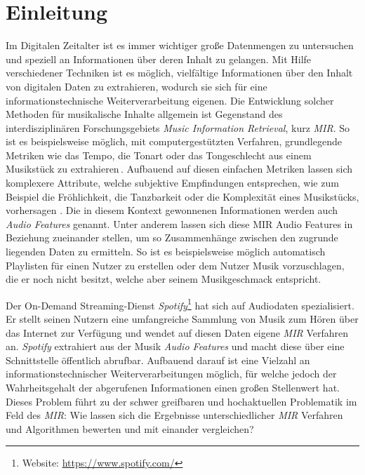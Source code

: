\section*{Einleitung}
\label{sec:Einleitung}

Im Digitalen Zeitalter ist es immer wichtiger große Datenmengen zu untersuchen und speziell an Informationen über deren Inhalt zu gelangen.
Mit Hilfe verschiedener Techniken ist es möglich, vielfältige Informationen über den Inhalt von digitalen Daten zu extrahieren, wodurch sie sich für eine informationstechnische Weiterverarbeitung eigenen.
Die Entwicklung solcher Methoden für musikalische Inhalte allgemein ist Gegenstand des interdisziplinären Forschungsgebiets \textit{Music Information Retrieval}, kurz \textit{MIR}.
So ist es beispielsweise möglich, mit computergestützten Verfahren, grundlegende Metriken wie das Tempo, die Tonart oder das Tongeschlecht aus einem Musikstück zu extrahieren\,\cite{Casey2008}.
Aufbauend auf diesen einfachen Metriken lassen sich komplexere Attribute, welche subjektive Empfindungen entsprechen, wie zum Beispiel die Fröhlichkeit, die Tanzbarkeit oder die Komplexität eines Musikstücks, vorhersagen \cite{Sturm2013}.
Die in diesem Kontext gewonnenen Informationen werden auch \textit{Audio Features} genannt.
Unter anderem lassen sich diese MIR Audio Features in Beziehung zueinander stellen, um so Zusammenhänge zwischen den zugrunde liegenden Daten zu ermitteln.
So ist es beispielsweise möglich automatisch Playlisten für einen Nutzer zu erstellen oder dem Nutzer Musik vorzuschlagen, die er noch nicht besitzt, welche aber seinem Musikgeschmack entspricht.

Der On-Demand Streaming-Dienst \textit{Spotify}\footnote{Website: \url{https://www.spotify.com/}} hat sich auf Audiodaten spezialisiert.
Er stellt seinen Nutzern eine umfangreiche Sammlung von Musik zum Hören über das Internet zur Verfügung und wendet auf diesen Daten eigene \textit{MIR} Verfahren an.
\textit{Spotify} extrahiert aus der Musik \textit{Audio Features} und macht diese über eine Schnittstelle öffentlich abrufbar.
Aufbauend darauf ist eine Vielzahl an informationstechnischer Weiterverarbeitungen möglich, für welche jedoch der Wahrheitsgehalt der abgerufenen Informationen einen großen Stellenwert hat.
Dieses Problem führt zu der schwer greifbaren und hochaktuellen Problematik im Feld des \textit{MIR}:
Wie lassen sich die Ergebnisse unterschiedlicher \textit{MIR} Verfahren und Algorithmen bewerten und mit einander vergleichen? \cite{Downie2004}

